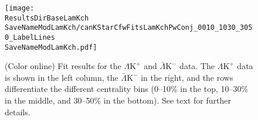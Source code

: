 \documentclass[ALICE,manyauthors]{cernphprep}
\newcommand{\ResultsDirBaseLamKch}{/home/jesse/Analysis/FemtoAnalysis/Results/Results_cLamcKch_20180505/}
\newcommand{\ResultsDirBaseLamKs}{/home/jesse/Analysis/FemtoAnalysis/Results/Results_cLamK0_20180505/}
\newcommand{\MomRes}{_MomResCrctn}%
\newcommand{\NonFlatBgdLamKch}{_NonFlatBgdCrctnLamK0LinearLamKchPolynomial}
\newcommand{\NonFlatBgdLamKs}{_NonFlatBgdCrctnLamK0LinearLamKchPolynomial}
\newcommand{\ResNum}{_3Res}
\newcommand{\PrimMaxDecay}{_PrimMaxDecay10fm}
\newcommand{\ResMethod}{_UsingXiDataAndCoulombOnly}
\newcommand{\ParamFixAndShareLamKch}{_ShareLam_Dualie_ShareLam_ShareRadii}
\newcommand{\ParamFixAndShareLamKs}{_ShareLam_Dualie_ShareLam_ShareRadii}
\newcommand{\SaveNameModLamKch}{\MomRes\NonFlatBgdLamKch\ResNum\PrimMaxDecay\ResMethod\ParamFixAndShareLamKch}
\newcommand{\SaveNameModLamKs}{\MomRes\NonFlatBgdLamKs\ResNum\PrimMaxDecay\ResMethod\ParamFixAndShareLamKs}
\newcommand{\LamK}{$\Lambda$K\xspace}
\newcommand{\LamKchP}{$\Lambda\mathrm{K^{+}}$\xspace}
\newcommand{\ALamKchM}{$\bar{\Lambda}\mathrm{K^{-}}$\xspace}
\newcommand{\LamKchPALamKchM}{$\Lambda\mathrm{K^{+}}$($\bar{\Lambda}\mathrm{K^{-}}$)\xspace}
\newcommand{\LamKchMALamKchP}{$\Lambda\mathrm{K^{-}}$($\bar{\Lambda}\mathrm{K^{+}}$)\xspace}
\newcommand{\LamKsALamKs}{$\Lambda\mathrm{K^{0}_{S}}$($\bar{\Lambda}\mathrm{K^{0}_{S}}$)\xspace}
\begin{document}
\begin{comment}
\begin{figure}[htp]
  \centering
  \subfigure[\LamKchPALamKchM]{
    \label{fig:LamKFits_3Res:a}
    \texttt{[image: \\ResultsDirBaseLamKch\\SaveNameModLamKch/canKStarCfwFitsLamKchPwConj\_0010\_1030\_3050\_LabelLines\\SaveNameModLamKch.pdf]}}
  \subfigure[\LamKchMALamKchP]{
    \label{fig:LamKFits_3Res:b}
    \texttt{[image: \\ResultsDirBaseLamKch\\SaveNameModLamKch/canKStarCfwFitsLamKchMwConj\_0010\_1030\_3050\_LabelLines\\SaveNameModLamKch.pdf]}}
  \\  
  \subfigure[\LamKsALamKs]{
    \label{fig:LamKFits_3Res:c}
    \texttt{[image: \\ResultsDirBaseLamKs\\SaveNameModLamKs/canKStarCfwFitsLamK0wConj\_0010\_1030\_3050\_LabelLines\\SaveNameModLamKs.pdf]}}    
  \caption{Fits, with 3 residual correlations included, for all \LamK analyses across all studied centralities (0--10\%, 10--30\%, and 30--50\%).
 The lines represent the statistical errors, while the boxes represent the systematic errors.
 The black solid line represents the primary (\LamK) correlation's contribution to the fit.  
 The green line shows the fit to the non-flat background.
 The purple points show the fit after all residuals' contributions have been included, and momentum resolution and non-flat background corrections have been applied.
 The extracted fit values with uncertainties are printed.}  
  \label{fig:LamKFits_3Res}
\end{figure}
\end{comment}

\begin{figure}[h]
  \centering
  \texttt{[image: \\ResultsDirBaseLamKch\\SaveNameModLamKch/canKStarCfwFitsLamKchPwConj\_0010\_1030\_3050\_LabelLines\\SaveNameModLamKch.pdf]}
  \caption[\LamKchPALamKchM data with fits]
  {
  (Color online) Fit results for the \LamKchP and \ALamKchM data.
  The \LamKchP data is shown in the left column, the \ALamKchM in the right, and the rows differentiate the different centrality bins (0--10\% in the top, 10--30\% in the middle, and 30--50\% in the bottom).
  See text for further details.
  }
  \label{fig:LamKchPwConjFits_3Res}
\end{figure}
\end{document}
